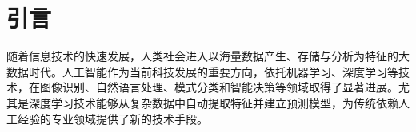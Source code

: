 \documentclass{CQMUReport}  %
\date{\today}
\begin{document}
\cover
\thispagestyle{empty} %
\clearpage

\begin{abstract}

随着大数据、人工智能与深度学习技术的快速发展，
法医学正逐步由传统经验判断向数据驱动和智能分析模式转变。
人工智能能够对海量、复杂且多模态的法医学数据进行高效处理，在法医病理学、
法医影像学、法医遗传学、法医毒物分析以及个体识别等领域展现出较高的应用价值。
基于深度学习的图像识别、模式分类和预测模型，可辅助完成损伤识别、
死因推断、年龄估计、DNA数据分析及毒物筛查，从而提高鉴定效率与结果的一致性。
同时，大数据平台能够促进不同来源法医学信息的整合，为智能化鉴定和科研提供数据基础。
然而，人工智能在法医学中的应用仍面临数据质量与标准化不足、
算法可解释性有限、隐私保护及伦理责任界定等问题。未来应加强高质量数据库建设、
算法验证及规范制定，推动人工智能技术与法医学实践深度融合，
为更加客观、精准和高效的司法鉴定提供技术支持。


\vspace{16em}
关键词：人工智能；深度学习；大数据；法医学；司法鉴定；智能分析
\end{abstract}
\thispagestyle{empty} %
\clearpage


\setcounter{page}{1}
\tableofcontents
\clearpage

\setcounter{page}{1}


\newpage

\section{引言}

随着信息技术的快速发展，人类社会进入以海量数据产生、存储与分析为特征的大数据时代。人工智能作为当前科技发展的重要方向，依托机器学习、深度学习等技术，在图像识别、自然语言处理、模式分类和智能决策等领域取得了显著进展。尤其是深度学习技术能够从复杂数据中自动提取特征并建立预测模型，为传统依赖人工经验的专业领域提供了新的技术手段。
\end{document}
